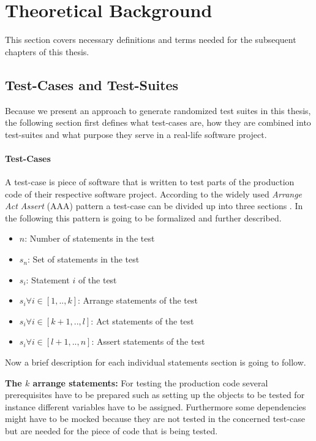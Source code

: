 \documentclass[
fancyheadings, %
%
%
]{stsreprt}
\begin{document}
\chapter{Theoretical Background}\label{ch:background}
This section covers necessary definitions and terms needed for the subsequent chapters of this thesis. 

\section{Test-Cases and Test-Suites}
Because we present an approach to generate randomized test suites in this thesis, the following section first defines what test-cases are, how they are combined into test-suites and what purpose they serve in a real-life software project.

\subsubsection{Test-Cases}
A test-case is piece of software that is written to test parts of the production code of their respective software project. According to the widely used \textit{Arrange Act Assert} (AAA) pattern a test-case can be divided up into three sections \cite{darbord:2023}. In the following this pattern is going to be formalized and further described. \par
\begin{itemize}
    \item $n$: Number of statements in the test
    \item $s_n$: Set of statements in the test
    \item $s_i$: Statement $i$ of the test
    \item $s_i \forall i \in [1, .., k]$: Arrange statements of the test
    \item $s_i \forall i \in [k+1, .., l]$: Act statements of the test
    \item $s_i \forall i \in [l+1, .., n]$: Assert statements of the test
\end{itemize} 
Now a brief description for each individual statements section is going to follow.\par
\textbf{The $k$ arrange statements:} For testing the production code several prerequisites have to be prepared such as setting up the objects to be tested for instance different variables have to be assigned. Furthermore 
some dependencies might have to be mocked because they are not tested in the concerned test-case but are needed for the piece of code that is being tested. \par
\end{document}
